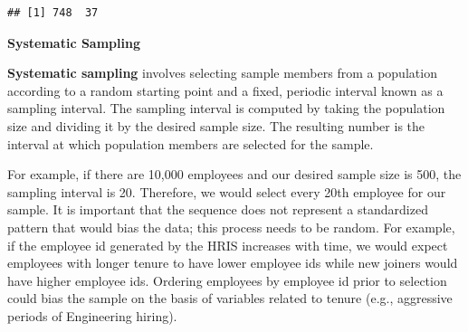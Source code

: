 \documentclass[
]{book}
\newenvironment{Shaded}{\begin{snugshade}}{\end{snugshade}}
\newcommand{\AttributeTok}[1]{\textcolor[rgb]{0.77,0.63,0.00}{#1}}
\newcommand{\CommentTok}[1]{\textcolor[rgb]{0.56,0.35,0.01}{\textit{#1}}}
\newcommand{\DecValTok}[1]{\textcolor[rgb]{0.00,0.00,0.81}{#1}}
\newcommand{\FunctionTok}[1]{\textcolor[rgb]{0.00,0.00,0.00}{#1}}
\newcommand{\NormalTok}[1]{#1}
\newcommand{\OtherTok}[1]{\textcolor[rgb]{0.56,0.35,0.01}{#1}}
\newcommand{\SpecialCharTok}[1]{\textcolor[rgb]{0.00,0.00,0.00}{#1}}
\begin{document}
\begin{Shaded}
\end{Shaded}

\begin{verbatim}
## [1] 748  37
\end{verbatim}

\textbf{Systematic Sampling}

\textbf{Systematic sampling} involves selecting sample members from a population according to a random starting point and a fixed, periodic interval known as a sampling interval. The sampling interval is computed by taking the population size and dividing it by the desired sample size. The resulting number is the interval at which population members are selected for the sample.

For example, if there are 10,000 employees and our desired sample size is 500, the sampling interval is 20. Therefore, we would select every 20th employee for our sample. It is important that the sequence does not represent a standardized pattern that would bias the data; this process needs to be random. For example, if the employee id generated by the HRIS increases with time, we would expect employees with longer tenure to have lower employee ids while new joiners would have higher employee ids. Ordering employees by employee id prior to selection could bias the sample on the basis of variables related to tenure (e.g., aggressive periods of Engineering hiring).
\end{document}
